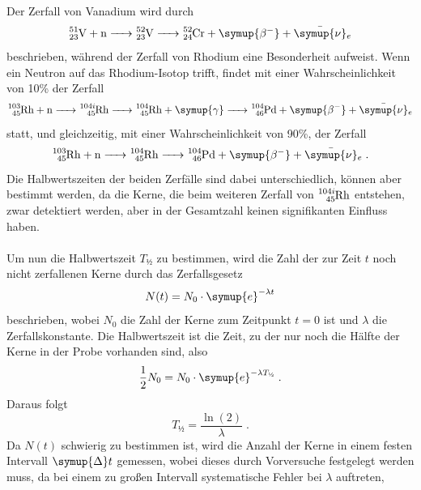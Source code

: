     Der Zerfall von Vanadium wird durch
    \begin{equation*}
        \ce{^{51}_{23}V + n -> ^{52}_{23}V -> ^{52}_{24}Cr + \symup{\beta^{-}} + \bar{\symup{\nu}}_e}
    \end{equation*}
    beschrieben,
    während der Zerfall von Rhodium eine Besonderheit aufweist.
    Wenn ein Neutron auf das Rhodium-Isotop trifft,
    findet mit einer Wahrscheinlichkeit von 10\% der Zerfall
    \begin{equation*}
        \ce{^{103}_{45}Rh + n -> ^{104i}_{45}Rh -> ^{104}_{45}Rh + \symup{\gamma} -> ^{104}_{46}Pd + \symup{\beta^{-}} + \bar{\symup{\nu}}_e}
    \end{equation*}
    statt,
    und gleichzeitig,
    mit einer Wahrscheinlichkeit von 90\%, der Zerfall
    \begin{equation*}
        \ce{^{103}_{45}Rh + n -> ^{104}_{45}Rh -> ^{104}_{46}Pd + \symup{\beta^{-}} + \bar{\symup{\nu}}_e} \; .
    \end{equation*}
    Die Halbwertszeiten der beiden Zerfälle sind dabei unterschiedlich,
    können aber bestimmt werden,
    da die Kerne, die beim weiteren Zerfall von $\ce{^{104i}_{45}Rh}$ entstehen,
    zwar detektiert werden, aber in der Gesamtzahl keinen signifikanten Einfluss haben.\\
    \\
    Um nun die Halbwertszeit $T_\text{½}$ zu bestimmen,
    wird die Zahl der zur Zeit $t$ noch nicht zerfallenen Kerne durch das Zerfallsgesetz
    \begin{equation}
        \label{eqn:zerfallsgesetz}
        N(t) = N_0 \cdot \symup{e}^{-\lambda t}
    \end{equation}
    beschrieben,
    wobei $N_0$ die Zahl der Kerne zum Zeitpunkt $t=0$ ist und $\lambda$ die Zerfallskonstante.
    Die Halbwertszeit ist die Zeit,
    zu der nur noch die Hälfte der Kerne in der Probe vorhanden sind,
    also
    \begin{equation*}
        \frac{1}{2} N_0 = N_0 \cdot \symup{e}^{-\lambda T_\text{½}} \; .
    \end{equation*}
    Daraus folgt
    \begin{equation}
        \label{eqn:Halbwertszeit}
        T_\text{½} = \frac{\operatorname{ln}(2)}{\lambda} \; .
    \end{equation}
    Da $N(t)$ schwierig zu bestimmen ist,
    wird die Anzahl der Kerne in einem festen Intervall $\symup{\Delta}t$ gemessen,
    wobei dieses durch Vorversuche festgelegt werden muss,
    da bei einem zu großen Intervall systematische Fehler bei $\lambda$ auftreten,
